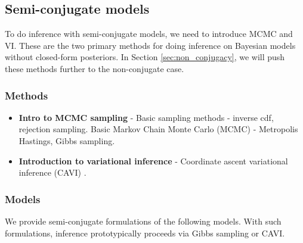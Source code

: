 \documentclass{article} %
\begin{document}



\subsection{Semi-conjugate models} \label{sec:semi_conjugacy}

To do inference with semi-conjugate models, we need to introduce MCMC and VI.  These are the two primary methods for doing inference on Bayesian models without closed-form posteriors. In Section \ref{sec:non_conjugacy}, we will push these methods further to the non-conjugate case.

\subsubsection{Methods}

\begin{itemize}
\item \textbf{Intro to MCMC sampling} - Basic sampling methods - inverse cdf,  rejection sampling. Basic Markov Chain Monte Carlo (MCMC) - Metropolis Hastings, Gibbs sampling.
\item \textbf{Introduction to variational inference} - Coordinate ascent variational inference (CAVI) \cite{wojnowiczXXXXfoundations}.
\end{itemize} 

\subsubsection{Models}
We provide semi-conjugate formulations of the following models.  With such formulations, inference prototypically proceeds via Gibbs sampling or CAVI. 
\end{document}
